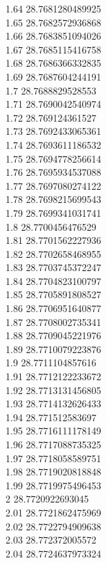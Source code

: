 {1.64	28.7681280489925\\
1.65	28.7682572936868\\
1.66	28.7683851094026\\
1.67	28.7685115416758\\
1.68	28.7686366332835\\
1.69	28.7687604244191\\
1.7	28.7688829528553\\
1.71	28.7690042540974\\
1.72	28.769124361527\\
1.73	28.7692433065361\\
1.74	28.7693611186532\\
1.75	28.7694778256614\\
1.76	28.7695934537088\\
1.77	28.7697080274122\\
1.78	28.7698215699543\\
1.79	28.7699341031741\\
1.8	28.7700456476529\\
1.81	28.7701562227936\\
1.82	28.7702658468955\\
1.83	28.7703745372247\\
1.84	28.7704823100797\\
1.85	28.7705891808527\\
1.86	28.7706951640877\\
1.87	28.7708002735341\\
1.88	28.7709045221976\\
1.89	28.7710079223876\\
1.9	28.7711104857616\\
1.91	28.7712122233672\\
1.92	28.7713131456805\\
1.93	28.7714132626433\\
1.94	28.771512583697\\
1.95	28.7716111178149\\
1.96	28.7717088735325\\
1.97	28.7718058589751\\
1.98	28.7719020818848\\
1.99	28.7719975496453\\
2	28.7720922693045\\
2.01	28.7721862475969\\
2.02	28.7722794909638\\
2.03	28.772372005572\\
2.04	28.7724637973324\\
}

